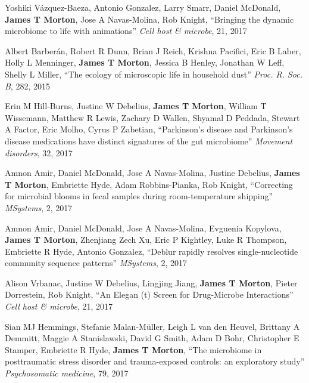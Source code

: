 \begin{frontmatter}
\begin{vitapage}
\begin{publications}
    \item  Yoshiki Vázquez-Baeza, Antonio  Gonzalez, Larry  Smarr, Daniel  McDonald, \textbf{James T Morton}, Jose A  Navas-Molina, Rob  Knight,  ``Bringing the dynamic microbiome to life with animations'' \emph{Cell host \& microbe}, 21, 2017


    \item  Albert Barberán, Robert R  Dunn, Brian J  Reich, Krishna  Pacifici, Eric B  Laber, Holly L  Menninger, \textbf{James T Morton}, Jessica B  Henley, Jonathan W  Leff, Shelly L  Miller,  ``The ecology of microscopic life in household dust'' \emph{Proc. R. Soc. B}, 282, 2015

    \item  Erin M Hill‐Burns, Justine W  Debelius, \textbf{James T Morton}, William T  Wissemann, Matthew R  Lewis, Zachary D  Wallen, Shyamal D  Peddada, Stewart A  Factor, Eric  Molho, Cyrus P  Zabetian,  ``Parkinson's disease and Parkinson's disease medications have distinct signatures of the gut microbiome'' \emph{Movement disorders}, 32, 2017


    \item  Amnon Amir, Daniel  McDonald, Jose A  Navas-Molina, Justine  Debelius, \textbf{James T Morton}, Embriette  Hyde, Adam  Robbins-Pianka, Rob  Knight,  ``Correcting for microbial blooms in fecal samples during room-temperature shipping'' \emph{MSystems}, 2, 2017

    \item  Amnon Amir, Daniel  McDonald, Jose A  Navas-Molina, Evguenia  Kopylova, \textbf{James T Morton}, Zhenjiang Zech  Xu, Eric P  Kightley, Luke R  Thompson, Embriette R  Hyde, Antonio  Gonzalez,  ``Deblur rapidly resolves single-nucleotide community sequence patterns'' \emph{MSystems}, 2, 2017

    \item  Alison Vrbanac, Justine W  Debelius, Lingjing  Jiang, \textbf{James T Morton}, Pieter  Dorrestein, Rob  Knight,  ``An Elegan (t) Screen for Drug-Microbe Interactions'' \emph{Cell host \& microbe}, 21, 2017

    \item  Sian MJ Hemmings, Stefanie  Malan-Müller, Leigh L  van den Heuvel, Brittany A  Demmitt, Maggie A  Stanislawski, David G  Smith, Adam D  Bohr, Christopher E  Stamper, Embriette R  Hyde, \textbf{James T Morton},  ``The microbiome in posttraumatic stress disorder and trauma-exposed controls: an exploratory study'' \emph{Psychosomatic medicine}, 79, 2017


\end{publications}
\end{vitapage}
\end{frontmatter}
